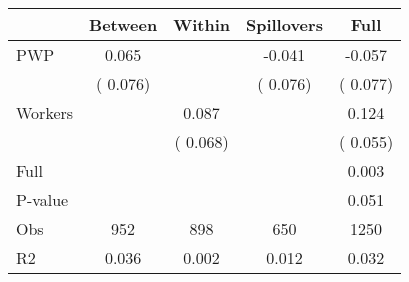 
\begin{tabular}{l*{4}{c}}\hline&\multicolumn{1}{c}{Between}&\multicolumn{1}{c}{Within}&\multicolumn{1}{c}{Spillovers}&\multicolumn{1}{c}{Full}\\ \hline
 PWP           &              0.065      &                                               &       -0.041 &        -0.057                            \\ 
                               &        (       0.076)           &                                       &       (       0.076)     &      (       0.077)                                           \\ 
 Workers       &                                               &        0.087    &                                &             0.124                            \\ 
                               &                                               & (       0.068)                  &                                        &      (       0.055)                                           \\ 
\hline                                                                                                                                                                                                                                            
 Full                  &                                               &                                               &                                        &             0.003                                     \\ 
 P-value               &                                               &                                               &                                        &             0.051                                           \\ 
 Obs                   &               952               &       898                       &       650                &              1250                                               \\ 
 R2                    &                      0.036              &              0.002                      &              0.012               &                     0.032                                              \\ 
\hline \end{tabular}                                                                                                                                                                                                              